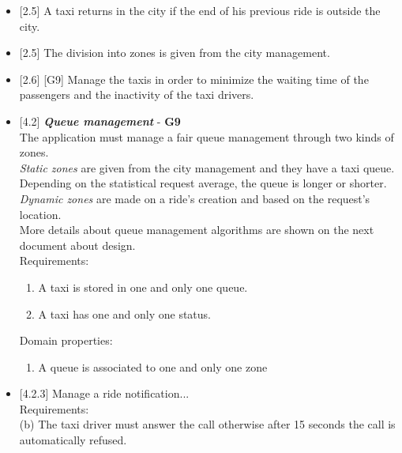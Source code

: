 \documentclass{article}
\begin{document}
\begin{itemize}

\item {[}2.5{]} A taxi returns in the city if the end of his previous ride is outside the city.

\item {[}2.5{]} The division into zones is given from the city management.

\item {[}2.6{]} [G9] Manage the taxis in order to minimize the waiting time of the passengers and the inactivity of the taxi drivers.

\item {[}4.2{]} \textit{\textbf{Queue management}} - \textbf{G9}\\
The application must manage a fair queue management through two kinds of zones.\\
\textit{Static zones} are given from the city management and they have a taxi queue. Depending on the statistical request average, the queue is longer or shorter.\\
\textit{Dynamic zones} are made on a ride's creation and based on the request's location.\\
More details about queue management algorithms are shown on the next document about design.\\

Requirements:
\begin{enumerate}[label=(\alph*)]
\item A taxi is stored in one and only one queue.
\item A taxi has one and only one status.
\end{enumerate}
Domain properties:
\begin{enumerate}[label=(\alph*)]
\item A queue is associated to one and only one zone
\end{enumerate}


\item {[4.2.3]} Manage a ride notification...\\
 Requirements:\\
 (b) The taxi driver must answer the call otherwise after 15 seconds the call is automatically refused.

\end{itemize}
\end{document}

